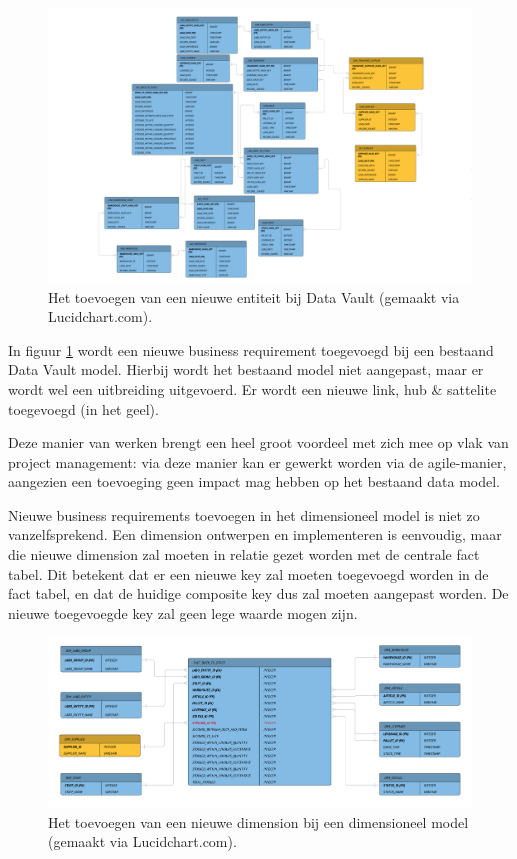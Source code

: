 \begin{figure}[h]
	\centering
	\includegraphics[scale=0.35]{../images/changedv.png}
	\caption{Het toevoegen van een nieuwe entiteit bij Data Vault (gemaakt via Lucidchart.com).}
	\label{fig:changedv}
\end{figure}

In figuur \ref{fig:changedv} wordt een nieuwe business requirement toegevoegd bij een bestaand Data Vault model. Hierbij wordt het bestaand model niet aangepast, maar er wordt wel een uitbreiding uitgevoerd. Er wordt een nieuwe link, hub \& sattelite toegevoegd (in het geel).

Deze manier van werken brengt een heel groot voordeel met zich mee op vlak van project management: via deze manier kan er gewerkt worden via de agile-manier, aangezien een toevoeging geen impact mag hebben op het bestaand data model.

Nieuwe business requirements toevoegen in het dimensioneel model is niet zo vanzelfsprekend. Een dimension ontwerpen en implementeren is eenvoudig, maar die nieuwe dimension zal moeten in relatie gezet worden met de centrale fact tabel. Dit betekent dat er een nieuwe key zal moeten toegevoegd worden in de fact tabel, en dat de huidige composite key dus zal moeten aangepast worden. De nieuwe toegevoegde key zal geen lege waarde mogen zijn.

\begin{figure}[h]
	\centering
	\includegraphics[scale=0.45]{../images/changedm.png}
	\caption{Het toevoegen van een nieuwe dimension bij een dimensioneel model (gemaakt via Lucidchart.com).}
	\label{fig:changedm}
\end{figure}

